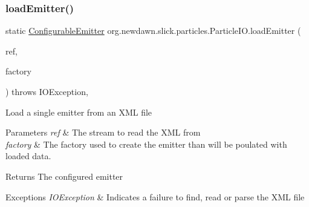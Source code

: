 \subsubsection{\texorpdfstring{load\+Emitter()}{loadEmitter()}\hspace{0.1cm}{\footnotesize\ttfamily [6/6]}}
{\footnotesize\ttfamily static \mbox{\hyperlink{classorg_1_1newdawn_1_1slick_1_1particles_1_1_configurable_emitter}{Configurable\+Emitter}} org.\+newdawn.\+slick.\+particles.\+Particle\+I\+O.\+load\+Emitter (\begin{DoxyParamCaption}\item[{Input\+Stream}]{ref,  }\item[{\mbox{\hyperlink{interfaceorg_1_1newdawn_1_1slick_1_1particles_1_1_configurable_emitter_factory}{Configurable\+Emitter\+Factory}}}]{factory }\end{DoxyParamCaption}) throws I\+O\+Exception\hspace{0.3cm}{\ttfamily [inline]}, {\ttfamily [static]}}

Load a single emitter from an X\+ML file


\begin{DoxyParams}{Parameters}
{\em ref} & The stream to read the X\+ML from \\
\hline
{\em factory} & The factory used to create the emitter than will be poulated with loaded data. \\
\hline
\end{DoxyParams}
\begin{DoxyReturn}{Returns}
The configured emitter 
\end{DoxyReturn}

\begin{DoxyExceptions}{Exceptions}
{\em I\+O\+Exception} & Indicates a failure to find, read or parse the X\+ML file \\
\hline
\end{DoxyExceptions}

